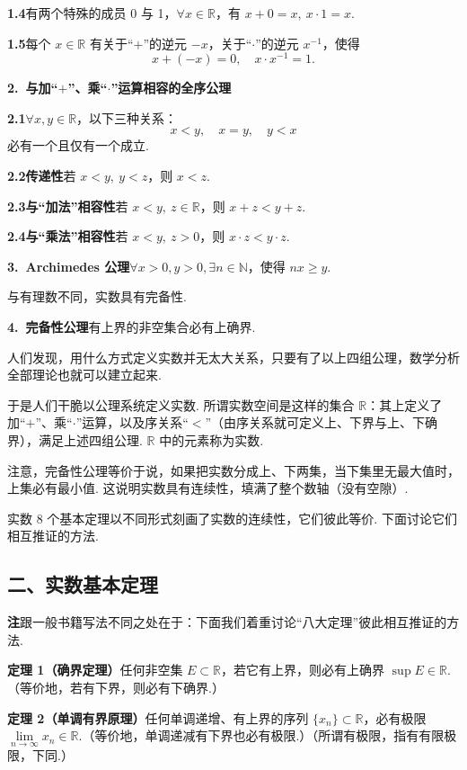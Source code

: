 \documentclass[UTF8,12pt,a4paper,fontset=fandol]{ctexart}
\begin{document}
\noindent\textbf{1.4}\quad 有两个特殊的成员 0 与 1，$\forall x\in\mathbb{R}$，有 $x+0=x,\ x\cdot1=x$.

\noindent\textbf{1.5}\quad 每个 $x\in\mathbb{R}$ 有关于“$+$”的逆元 $-x$，关于“$\cdot$”的逆元 $x^{-1}$，使得
\[
  x+(-x)=0,\quad x\cdot x^{-1}=1.
\]

\noindent\textbf{2.\ 与加“$+$”、乘“$\cdot$”运算相容的全序公理}

\noindent\textbf{2.1}\quad $\forall x,y\in\mathbb{R}$，以下三种关系：
\[
  x<y,\quad x=y,\quad y<x
\]
必有一个且仅有一个成立.

\noindent\textbf{2.2\quad 传递性}\quad 若 $x<y,\ y<z$，则 $x<z$.

\noindent\textbf{2.3\quad 与“加法”相容性}\quad 若 $x<y,\ z\in\mathbb{R}$，则 $x+z<y+z$.

\noindent\textbf{2.4\quad 与“乘法”相容性}\quad 若 $x<y,\ z>0$，则 $x\cdot z<y\cdot z$.

\noindent\textbf{3.\ Archimedes 公理}\quad $\forall x>0,y>0,\exists n\in\mathbb{N}$，使得 $nx\ge y$.

与有理数不同，实数具有完备性.

\noindent\textbf{4.\ 完备性公理}\quad 有上界的非空集合必有上确界.

人们发现，用什么方式定义实数并无太大关系，只要有了以上四组公理，数学分析全部理论也就可以建立起来.

于是人们干脆以公理系统定义实数. 所谓实数空间是这样的集合 $\mathbb{R}$：其上定义了加“$+$”、乘“$\cdot$”运算，以及序关系“$<$”（由序关系就可定义上、下界与上、下确界），满足上述四组公理. $\mathbb{R}$ 中的元素称为实数.

注意，完备性公理等价于说，如果把实数分成上、下两集，当下集里无最大值时，上集必有最小值. 这说明实数具有连续性，填满了整个数轴（没有空隙）.

实数 8 个基本定理以不同形式刻画了实数的连续性，它们彼此等价. 下面讨论它们相互推证的方法.

\subsection*{二、实数基本定理}

\noindent\textbf{注}\quad 跟一般书籍写法不同之处在于：下面我们着重讨论“八大定理”彼此相互推证的方法.

\noindent\textbf{定理 1（确界定理）}\quad 任何非空集 $E\subset\mathbb{R}$，若它有上界，则必有上确界 $\sup E\in\mathbb{R}$.（等价地，若有下界，则必有下确界.）

\noindent\textbf{定理 2（单调有界原理）}\quad 任何单调递增、有上界的序列 $\{x_n\}\subset\mathbb{R}$，必有极限 $\lim\limits_{n\to\infty}x_n\in\mathbb{R}$.（等价地，单调递减有下界也必有极限.）（所谓有极限，指有有限极限，下同.）
\end{document}
